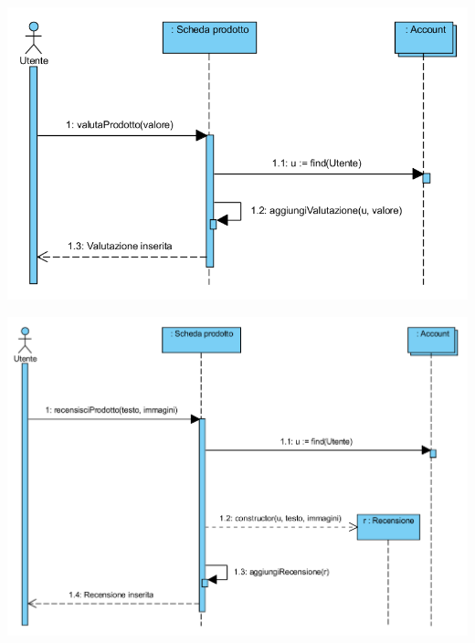 \begin{center}
			\includegraphics[width=\textwidth]{assets/visualParadigm/sequenza/inserimentoValutazione}
\end{center}

\begin{center}
			\includegraphics[width=\textwidth]{assets/visualParadigm/sequenza/inserimentoRecensione}
\end{center}

